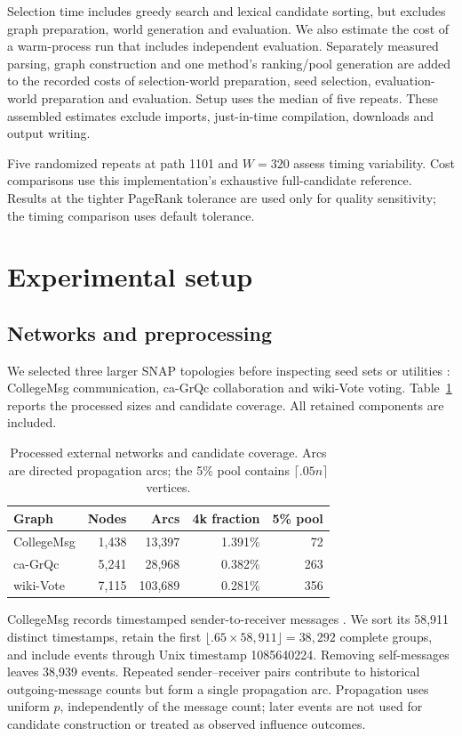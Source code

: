 \documentclass[smallextended]{svjour3}
\begin{document}
Selection time includes greedy search and lexical candidate sorting, but excludes graph preparation, world generation and evaluation. We also estimate the cost of a warm-process run that includes independent evaluation. Separately measured parsing, graph construction and one method's ranking/pool generation are added to the recorded costs of selection-world preparation, seed selection, evaluation-world preparation and evaluation. Setup uses the median of five repeats. These assembled estimates exclude imports, just-in-time compilation, downloads and output writing.

Five randomized repeats at path 1101 and $W=320$ assess timing variability. Cost comparisons use this implementation's exhaustive full-candidate reference. Results at the tighter PageRank tolerance are used only for quality sensitivity; the timing comparison uses default tolerance.

\section{Experimental setup}\label{sec:experimental-setup}
\subsection{Networks and preprocessing}
We selected three larger SNAP topologies before inspecting seed sets or utilities \cite{snap}: CollegeMsg communication, ca-GrQc collaboration and wiki-Vote voting. Table~\ref{tab:data} reports the processed sizes and candidate coverage. All retained components are included.
\begin{table}[htbp]
\caption{Processed external networks and candidate coverage. Arcs are directed propagation arcs; the 5\% pool contains $\lceil .05n\rceil$ vertices.}\label{tab:data}
\begin{tabular}{lrrrr}
\toprule
Graph & Nodes & Arcs & 4k fraction & 5\% pool \\
\midrule
CollegeMsg & 1,438 & 13,397 & 1.391\% & 72 \\
ca-GrQc & 5,241 & 28,968 & 0.382\% & 263 \\
wiki-Vote & 7,115 & 103,689 & 0.281\% & 356 \\
\bottomrule
\end{tabular}
\end{table}

CollegeMsg records timestamped sender-to-receiver messages \cite{college}. We sort its 58,911 distinct timestamps, retain the first $\lfloor .65\times58,911\rfloor=38,292$ complete groups, and include events through Unix timestamp 1085640224. Removing self-messages leaves 38,939 events. Repeated sender--receiver pairs contribute to historical outgoing-message counts but form a single propagation arc. Propagation uses uniform $p$, independently of the message count; later events are not used for candidate construction or treated as observed influence outcomes.
\end{document}

